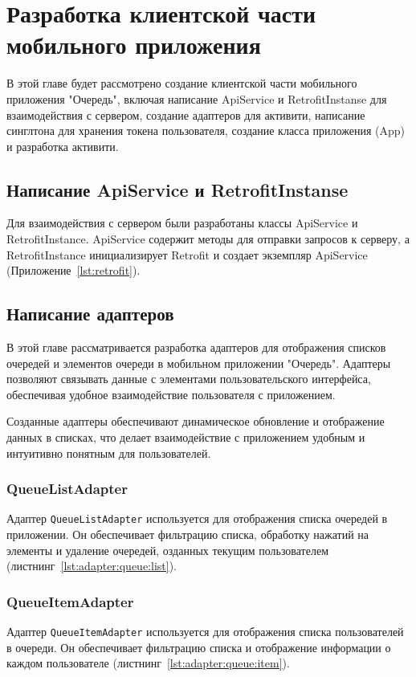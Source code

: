 
\section{Разработка клиентской части мобильного приложения}

В этой главе будет рассмотрено создание клиентской части мобильного
приложения "Очередь", включая написание ApiService и RetrofitInstanse
для взаимодействия с сервером, создание адаптеров для активити,
написание синглтона для хранения токена пользователя,
создание класса приложения (App) и разработка активити.

\subsection{Написание ApiService и RetrofitInstanse}

Для взаимодействия с сервером были разработаны
классы ApiService и RetrofitInstance.
ApiService содержит методы для отправки запросов к серверу,
а RetrofitInstance инициализирует Retrofit и создает экземпляр ApiService
(Приложение~\ref{lst:retrofit}).

\subsection{Написание адаптеров}

В этой главе рассматривается разработка адаптеров для отображения списков
очередей и элементов очереди в мобильном приложении "Очередь".
Адаптеры позволяют связывать данные с элементами пользовательского интерфейса,
обеспечивая удобное взаимодействие пользователя с приложением.\par
Созданные адаптеры обеспечивают динамическое обновление и отображение данных
в списках, что делает взаимодействие с приложением удобным
и интуитивно понятным для пользователей.

\subsubsection{QueueListAdapter}
Адаптер \texttt{QueueListAdapter} используется
для отображения списка очередей в приложении.
Он обеспечивает фильтрацию списка, обработку нажатий на элементы
и удаление очередей, озданных текущим пользователем
(листнинг~\ref{lst:adapter:queue:list}).

\subsubsection{QueueItemAdapter}
Адаптер \texttt{QueueItemAdapter} используется
для отображения списка пользователей в очереди.
Он обеспечивает фильтрацию списка и отображение информации
о каждом пользователе (листнинг~\ref{lst:adapter:queue:item}).


